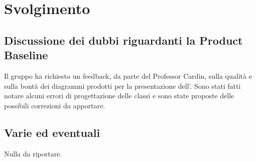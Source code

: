 \newpage
\section*{Svolgimento}

	\subsection*{Discussione dei dubbi riguardanti la Product Baseline}
		Il gruppo ha richiesto un feedback, da parte del Professor Cardin, sulla qualità e sulla bontà dei diagrammi prodotti per la presentazione dell'. Sono stati fatti notare alcuni errori di progettazione delle classi e sono state proposte delle possibili correzioni da apportare.

	\subsection*{Varie ed eventuali}
		Nulla da riportare.
